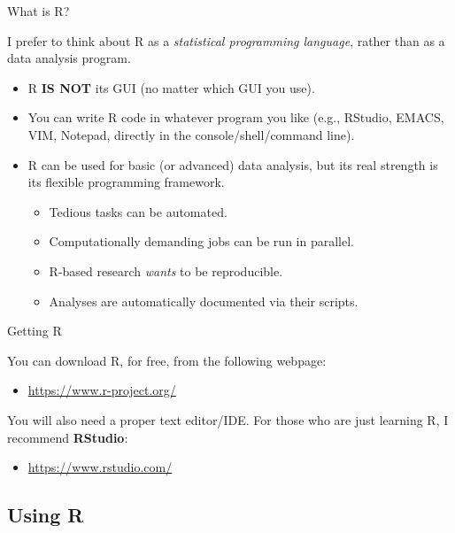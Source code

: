 \documentclass[10pt]{beamer}
\newcommand{\pkg}[1]{\textbf{#1}}
\begin{document}
\begin{frame}{What is R?}

  I prefer to think about R as a \emph{statistical programming language}, rather 
  than as a data analysis program.
  \vb
  \begin{itemize}
  \item R \textbf{IS NOT} its GUI (no matter which GUI you use).
    \vb
  \item You can write R code in whatever program you like (e.g., RStudio, EMACS, 
    VIM, Notepad, directly in the console/shell/command line).
    \vb
  \item R can be used for basic (or advanced) data analysis, but its real 
    strength is its flexible programming framework.
    \vc
    \begin{itemize}
      \item Tedious tasks can be automated.
        \vc
      \item Computationally demanding jobs can be run in parallel.
        \vc
      \item R-based research \emph{wants} to be reproducible.
        \vc
      \item Analyses are automatically documented via their scripts.
    \end{itemize}
  \end{itemize}

\end{frame}


\begin{frame}{Getting R}

  You can download R, for free, from the following webpage:
  \va
  \begin{itemize}
  \item \url{https://www.r-project.org/}
  \end{itemize}
  \va
  You will also need a proper text editor/IDE. For those who are just learning R, 
  I recommend \pkg{RStudio}:
  \va
  \begin{itemize}
  \item \url{https://www.rstudio.com/}
  \end{itemize}

\end{frame}


\subsection{Using R}
\end{document}
